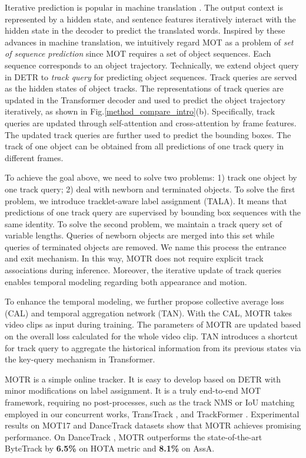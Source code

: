 \documentclass[runningheads]{llncs}
\begin{document}
Iterative prediction is popular in machine translation \cite{sutskever2014sequence,vaswani2017attention}. The output context is represented by a hidden state, and sentence features iteratively interact with the hidden state in the decoder to predict the translated words. Inspired by these advances in machine translation, we intuitively regard MOT as a problem of \emph{set of sequence prediction} since MOT requires a set of object sequences. Each sequence corresponds to an object trajectory. Technically, we extend object query in DETR to \emph{track query} for predicting object sequences. Track queries are served as the hidden states of object tracks. The representations of track queries are updated in the Transformer decoder and used to predict the object trajectory iteratively, as shown in Fig.\;\ref{method_compare_intro}(b). Specifically, track queries are updated through self-attention and cross-attention by frame features. The updated track queries are further used to predict the bounding boxes. The track of one object can be obtained from all predictions of one track query in different frames.

To achieve the goal above, we need to solve two problems: 1) track one object by one track query; 2) deal with newborn and terminated objects. To solve the first problem, we introduce tracklet-aware label assignment (TALA). It means that predictions of one track query are supervised by bounding box sequences with the same identity. To solve the second problem, we maintain a track query set of variable lengths. Queries of newborn objects are merged into this set while queries of terminated objects are removed. We name this process the entrance and exit mechanism.
In this way, MOTR does not require explicit track associations during inference. Moreover, the iterative update of track queries enables temporal modeling regarding both appearance and motion.

To enhance the temporal modeling, we further propose collective average loss (CAL) and temporal aggregation network (TAN). With the CAL, MOTR takes video clips as input during training. The parameters of MOTR are updated based on the overall loss calculated for the whole video clip. TAN introduces a shortcut for track query to aggregate the historical information from its previous states via the key-query mechanism in Transformer.

MOTR is a simple online tracker. It is easy to develop based on DETR with minor modifications on label assignment. It is a truly end-to-end MOT framework, requiring no post-processes, such as the track NMS or IoU matching employed in our concurrent works, TransTrack \cite{transtrack}, and TrackFormer \cite{Meinhardt2021trackformer}.
Experimental results on MOT17 and DanceTrack datasets show that MOTR achieves promising performance. On DanceTrack \cite{peize2021dance}, MOTR outperforms the state-of-the-art ByteTrack \cite{zhang2021bytetrack} by \textbf{6.5\%} on HOTA metric and \textbf{8.1\%} on AssA.
\end{document}
